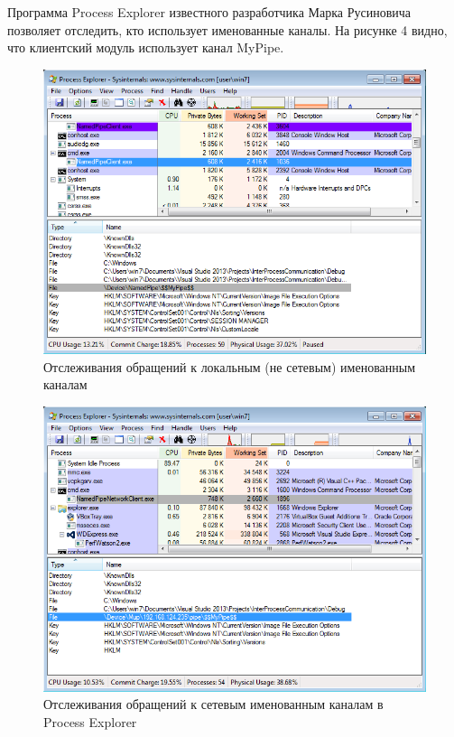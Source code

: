 \documentclass[a4paper, 12pt]{report}		%
\begin{document}
Программа Process Explorer известного разработчика Марка Русиновича позволяет отследить, кто использует именованные каналы. На рисунке 4 видно, что клиентский модуль использует канал MyPipe.
\vspace{2em}

\begin{figure}[h!]
\centering
\includegraphics[scale=0.85]{res/04_Process_Explorer_np}
\caption{Отслеживания обращений к локальным (не сетевым) именованным каналам}
\end{figure}

\begin{figure}[h!]
\centering
\includegraphics[scale=0.85]{res/05_Process_Explorer_npn}
\caption{Отслеживания обращений к сетевым именованным каналам в Process Explorer}
\end{figure}
\end{document}
